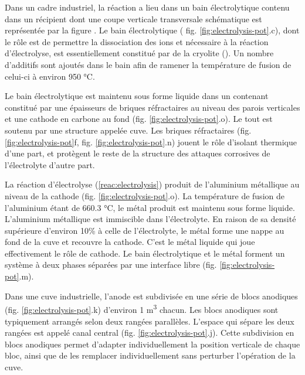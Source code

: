 Dans un cadre industriel, la réaction a lieu dans un bain
électrolytique contenu dans un récipient dont une coupe verticale
transversale schématique est représentée par la figure
. Le bain électrolytique (
fig. \ref{fig:electrolysis-pot}.c), dont le rôle est de permettre la
dissociation des ions  et  nécessaire à la
réaction d'électrolyse, est essentiellement constitué par de la
cryolite (). Un nombre d'additifs sont ajoutés dans le
bain afin de ramener la température de fusion de celui-ci à environ
\num{950} \si{\celsius}.

Le bain électrolytique est maintenu sous forme liquide dans un
contenant constitué par une épaisseurs de briques réfractaires au
niveau des parois verticales et une cathode en carbone au fond
(fig. \ref{fig:electrolysis-pot}.o). Le tout est soutenu par une
structure appelée cuve. Les briques réfractaires
(fig. \ref{fig:electrolysis-pot}f, fig. \ref{fig:electrolysis-pot}.n)
jouent le rôle d'isolant thermique d'une part, et protègent le reste
de la structure des attaques corrosives de l'électrolyte d'autre part.

La réaction d'électrolyse (\ref{reac:electrolysis}) produit de
l'aluminium métallique au niveau de la cathode
(fig. \ref{fig:electrolysis-pot}.o). La température de fusion de
l'aluminium étant de \num{660.3} \si{\celsius}, le métal produit est
maintenu sous forme liquide. L'aluminium métallique est immiscible
dans l'électrolyte. En raison de sa densité supérieure d'environ
\num{10}\% à celle de l'électrolyte, le métal forme une nappe au fond
de la cuve et recouvre la cathode. C'est le métal liquide qui joue
effectivement le rôle de cathode. Le bain électrolytique et le métal
forment un système à deux phases séparées par une interface libre
(fig. \ref{fig:electrolysis-pot}.m).

Dans une cuve industrielle, l'anode est subdivisée en une série de
blocs anodiques (fig. \ref{fig:electrolysis-pot}.k) d'environ \num{1}
\si{\cubic\meter} chacun. Les blocs anodiques sont typiquement
arrangés selon deux rangées parallèles. L'espace qui sépare les deux
rangées est appelé canal central
(fig. \ref{fig:electrolysis-pot}.j). Cette subdivision en blocs
anodiques permet d'adapter individuellement la position verticale de
chaque bloc, ainsi que de les remplacer individuellement sans
perturber l'opération de la cuve.

